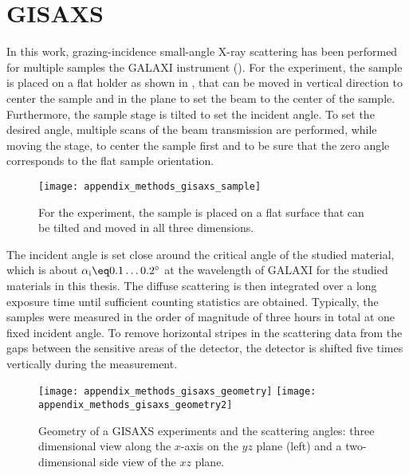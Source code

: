 \documentclass[\main/dresen_thesis.tex]{subfiles}
\begin{document}
  \section{GISAXS}
    \label{app:methods:gisaxs}
    In this work, grazing-incidence small-angle X-ray scattering has been performed for multiple samples the GALAXI instrument ().
    For the experiment, the sample is placed on a flat holder as shown in , that can be moved in vertical direction to center the sample and in the plane to set the beam to the center of the sample.
    Furthermore, the sample stage is tilted to set the incident angle.
    To set the desired angle, multiple scans of the beam transmission are performed, while moving the stage, to center the sample first and to be sure that the zero angle corresponds to the flat sample orientation.
    \begin{figure}[tb]
      \centering
      \texttt{[image: appendix\_methods\_gisaxs\_sample]}
      \caption{\label{fig:appendix:methods:saxs:samples}For the experiment, the sample is placed on a flat surface that can be tilted and moved in all three dimensions.}
    \end{figure}

    The incident angle is set close around the critical angle of the studied material, which is about $\alpha_\mathrm{i} \eq 0.1 \ldots 0.2 ^\circ$ at the wavelength of GALAXI for the studied materials in this thesis.
    The diffuse scattering is then integrated over a long exposure time until sufficient counting statistics are obtained.
    Typically, the samples were measured in the order of magnitude of three hours in total at one fixed incident angle.
    To remove horizontal stripes in the scattering data from the gaps between the sensitive areas of the detector, the detector is shifted five times vertically during the measurement.

    \begin{figure}[tb]
      \centering
      \texttt{[image: appendix\_methods\_gisaxs\_geometry]}
      \texttt{[image: appendix\_methods\_gisaxs\_geometry2]}
      \caption{\label{fig:appendix:methods:gisaxs:geometry}Geometry of a GISAXS experiments and the scattering angles: three dimensional view along the $x$-axis on the $yz$ plane (left) and a two-dimensional side view of the $xz$ plane.}
    \end{figure}
\end{document}

